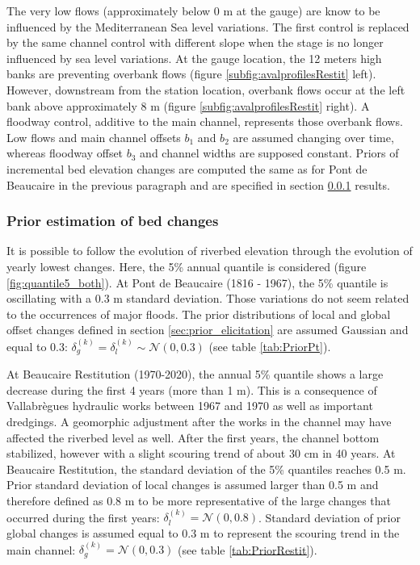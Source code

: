 \documentclass[11pt]{article}
\begin{document}
        The very low flows (approximately below 0 m at the gauge) are know to be influenced by the Mediterranean Sea level variations. The first control is replaced by the same channel control with different slope when the stage is no longer influenced by sea level variations. At the gauge location, the 12 meters high banks are preventing overbank flows (figure \ref{subfig:avalprofilesRestit} left). However, downstream from the station location, overbank flows occur at the left bank above approximately 8 m (figure \ref{subfig:avalprofilesRestit} right). A floodway control, additive to the main channel, represents those overbank flows. Low flows and main channel offsets $b_1$ and $b_2$ are assumed changing over time, whereas floodway offset $b_3$ and channel widths are supposed constant. Priors of incremental bed elevation changes are computed the same as for Pont de Beaucaire in the previous paragraph and are specified in section \ref{sec:stageevolution} results.

    \subsubsection{Prior estimation of bed changes}
    \label{sec:stageevolution}
    
    It is possible to follow the evolution of riverbed elevation through the evolution of yearly lowest changes. Here, the 5\% annual quantile is considered (figure \ref{fig:quantile5_both}). At Pont de Beaucaire (1816 - 1967), the 5\% quantile is oscillating with a 0.3 m standard deviation. Those variations do not seem related to the occurrences of major floods. The prior distributions of local and global offset changes defined in section \ref{sec:prior_elicitation} are assumed Gaussian and equal to 0.3: $\delta_g^{(k)} = \delta_l^{(k)} \sim \mathcal{N}(0,0.3)$ (see table \ref{tab:PriorPt}).
    
    At Beaucaire Restitution (1970-2020), the annual 5\% quantile shows a large decrease during the first 4 years (more than 1 m). This is a consequence of Vallabrègues hydraulic works between 1967 and 1970 as well as important dredgings. A geomorphic adjustment after the works in the channel may have affected the riverbed level as well. After the first years, the channel bottom stabilized, however with a slight scouring trend of about 30 cm in 40 years. At Beaucaire Restitution, the standard deviation of the 5\% quantiles reaches 0.5 m. Prior standard deviation of local changes is assumed larger than 0.5 m and therefore defined as 0.8 m to be more representative of the large changes that occurred during the first years: $\delta_l^{(k)} = \mathcal{N}(0,0.8)$. Standard deviation of prior global changes is assumed equal to 0.3 m to represent the scouring trend in the main channel: $\delta_g^{(k)} = \mathcal{N}(0,0.3)$ (see table \ref{tab:PriorRestit}).
    
\end{document}
